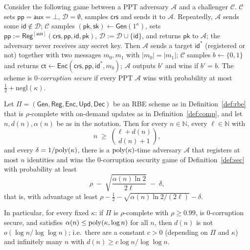 \documentclass{aicr-conjecture}
\newcommand{\Gen}{\mathsf{Gen}}
\newcommand{\Reg}{\mathsf{Reg}}
\newcommand{\Enc}{\mathsf{Enc}}
\newcommand{\Upd}{\mathsf{Upd}}
\newcommand{\Dec}{\mathsf{Dec}}
\newcommand{\pp}{\mathsf{pp}}
\newcommand{\aux}{\mathsf{aux}}
\newcommand{\crs}{\mathsf{crs}}
\newcommand{\pk}{\mathsf{pk}}
\newcommand{\sk}{\mathsf{sk}}
\newcommand{\id}{\mathsf{id}}
\newcommand{\ct}{\mathsf{ct}}
\newcommand{\negl}{\mathrm{negl}}
\newcommand{\Nat}{\mathbb{N}}
\begin{document}
\begin{definition}\label{def:sec}
Consider the following game between a PPT adversary $\mathcal{A}$ and a
challenger $\mathcal{C}$. $\mathcal{C}$ sets $\pp = \aux = \bot$,
$\mathcal{D} = \emptyset$, samples $\crs$ and sends it to $\mathcal{A}$.
Repeatedly, $\mathcal{A}$ sends some $\id \notin \mathcal{D}$;
$\mathcal{C}$ samples $(\pk,\sk) \leftarrow \Gen(1^{\kappa})$, sets
$\pp := \Reg^{[\aux]}(\crs,\pp,\id,\pk)$,
$\mathcal{D} := \mathcal{D} \cup \{\id\}$, and returns $\pk$ to
$\mathcal{A}$; the adversary never receives any secret key. Then
$\mathcal{A}$ sends a target $\id^{*}$ (registered or not) together with
two messages $m_0, m_1$ with $|m_0| = |m_1|$; $\mathcal{C}$ samples
$b \leftarrow \{0,1\}$ and returns
$\ct \leftarrow \Enc(\crs,\pp,\id^{*},m_b)$; $\mathcal{A}$ outputs $b'$
and wins if $b' = b$. The scheme is \emph{$0$-corruption secure} if
every PPT $\mathcal{A}$ wins with probability at most
$\tfrac12 + \negl(\kappa)$.
\end{definition}

\begin{conjecture}\label{conj:main}
Let $\Pi = (\Gen,\Reg,\Enc,\Upd,\Dec)$ be an RBE scheme as in
Definition~\ref{def:rbe} that is $\rho$-complete with on-demand updates
as in Definition~\ref{def:comp}, and let $n, d(n), \alpha(n)$ be as in
the notation. Then for every $n \in \Nat$, every $\ell \in \Nat$ with
\[
  n \;\ge\; \binom{\ell + d(n)}{\,d(n)+1\,},
\]
and every $\delta = 1/\mathrm{poly}(\kappa)$, there is a $\mathrm{poly}(\kappa)$-time
adversary $\mathcal{A}$ that registers at most $n$ identities and wins
the $0$-corruption security game of Definition~\ref{def:sec} with
probability at least
\[
  \rho \;-\; \sqrt{\frac{\alpha(n)\ln 2}{2\ell}} \;-\; \delta ,
\]
that is, with advantage at least
$\rho - \tfrac12 - \sqrt{\alpha(n)\ln 2/(2\ell)} - \delta$.

In particular, for every fixed $\kappa$: if $\Pi$ is $\rho$-complete
with $\rho \ge 0.99$, is $0$-corruption secure, and satisfies
$\alpha(n) \le \mathrm{poly}(\kappa,\log n)$ for all $n$, then $d(n)$ is not
$o(\log n/\log\log n)$; i.e.\ there are a constant $c > 0$ (depending on
$\Pi$ and $\kappa$) and infinitely many $n$ with
$d(n) \ge c \log n / \log\log n$.
\end{conjecture}
\end{document}
